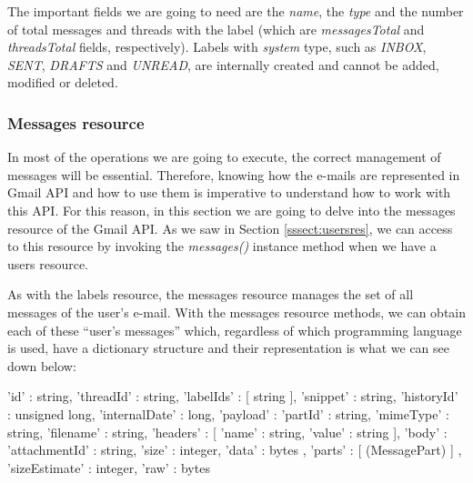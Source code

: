 The important fields we are going to need are the \textit{name}, the \textit{type} and the number of total messages and threads with the label (which are \textit{messagesTotal} and \textit{threadsTotal} fields, respectively). Labels with \textit{system} type, such as \textit{INBOX}, \textit{SENT}, \textit{DRAFTS} and \textit{UNREAD}, are internally created and cannot be added, modified or deleted.

\subsubsection{Messages resource}\label{sssect:msgres}
In most of the operations we are going to execute, the correct management of messages will be essential. Therefore, knowing how the e-mails are represented in Gmail API and how to use them is imperative to understand how to work with this API. For this reason, in this section we are going to delve into the messages resource \citep[/v1/reference/users/messages]{gmailAPI} of the Gmail API. As we saw in Section \ref{sssect:usersres}, we can access to this resource by invoking the \textit{messages()} instance method when we have a users resource.

As with the labels resource, the messages resource manages the set of all messages of the user's e-mail. With the messages resource methods, we can obtain each of these ``user's messages'' which, regardless of which programming language is used, have a dictionary structure and their representation is what we can see down below:

\begin{python}
	{
		'id' : string,
		'threadId' : string,
		'labelIds' : [ string ],
		'snippet' : string,
		'historyId' : unsigned long,
		'internalDate' : long,
		'payload' : {
			'partId' : string,
			'mimeType' : string,
			'filename' : string,
			'headers' : [
			{
				'name' : string,
				'value' : string
			}
			],
			'body' : {
				'attachmentId' : string,
				'size' : integer,
				'data' : bytes
			},
			'parts' : [ (MessagePart) ]
		},
		'sizeEstimate' : integer,
		'raw' : bytes
	}
\end{python}

